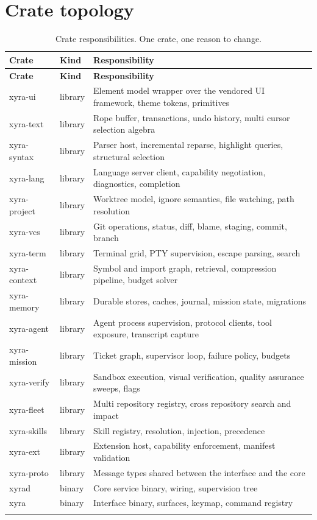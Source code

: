 \section{Crate topology}

\begin{longtable}{@{}p{} p{} p{}@{}}
\toprule
\textbf{Crate} & \textbf{Kind} & \textbf{Responsibility} \\
\midrule
\endfirsthead
\toprule
\textbf{Crate} & \textbf{Kind} & \textbf{Responsibility} \\
\midrule
\endhead
xyra-ui & library & Element model wrapper over the vendored UI framework, theme tokens, primitives \\
xyra-text & library & Rope buffer, transactions, undo history, multi cursor selection algebra \\
xyra-syntax & library & Parser host, incremental reparse, highlight queries, structural selection \\
xyra-lang & library & Language server client, capability negotiation, diagnostics, completion \\
xyra-project & library & Worktree model, ignore semantics, file watching, path resolution \\
xyra-vcs & library & Git operations, status, diff, blame, staging, commit, branch \\
xyra-term & library & Terminal grid, PTY supervision, escape parsing, search \\
xyra-context & library & Symbol and import graph, retrieval, compression pipeline, budget solver \\
xyra-memory & library & Durable stores, caches, journal, mission state, migrations \\
xyra-agent & library & Agent process supervision, protocol clients, tool exposure, transcript capture \\
xyra-mission & library & Ticket graph, supervisor loop, failure policy, budgets \\
xyra-verify & library & Sandbox execution, visual verification, quality assurance sweeps, flags \\
xyra-fleet & library & Multi repository registry, cross repository search and impact \\
xyra-skills & library & Skill registry, resolution, injection, precedence \\
xyra-ext & library & Extension host, capability enforcement, manifest validation \\
xyra-proto & library & Message types shared between the interface and the core \\
xyrad & binary & Core service binary, wiring, supervision tree \\
xyra & binary & Interface binary, surfaces, keymap, command registry \\
\bottomrule
\caption{Crate responsibilities. One crate, one reason to change.}
\end{longtable}

